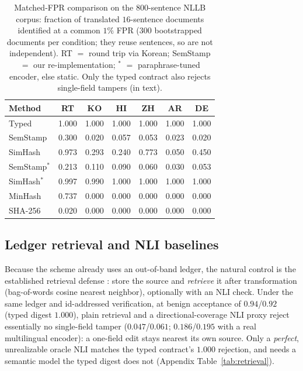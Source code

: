 \documentclass[journal]{IEEEtran}
\begin{document}
\begin{table}[t]
\centering
\caption{Matched-FPR comparison on the 800-sentence NLLB corpus: fraction of
translated $16$-sentence documents identified at a common $1\%$ FPR ($300$
bootstrapped documents per condition; they reuse sentences, so are not
independent). RT $=$ round trip via Korean; SemStamp $=$ our re-implementation;
$^\ast$ $=$ paraphrase-tuned encoder, else static. Only the typed contract also
rejects single-field tampers (in text).}
\label{tab:matched}
\footnotesize
\setlength{\tabcolsep}{3pt}
\begin{tabular*}{\linewidth}{@{}l@{\extracolsep{\fill}}cccccc@{}}
\toprule
Method & RT & KO & HI & ZH & AR & DE \\
\midrule
Typed          & 1.000 & 1.000 & 1.000 & 1.000 & 1.000 & 1.000 \\
SemStamp       & 0.300 & 0.020 & 0.057 & 0.053 & 0.023 & 0.020 \\
SimHash        & 0.973 & 0.293 & 0.240 & 0.773 & 0.050 & 0.450 \\
SemStamp$^\ast$ & 0.213 & 0.110 & 0.090 & 0.060 & 0.030 & 0.053 \\
SimHash$^\ast$  & 0.997 & 0.990 & 1.000 & 1.000 & 1.000 & 1.000 \\
MinHash        & 0.737 & 0.000 & 0.000 & 0.000 & 0.000 & 0.000 \\
SHA-256        & 0.020 & 0.000 & 0.000 & 0.000 & 0.000 & 0.000 \\
\bottomrule
\end{tabular*}
\end{table}

\subsection{Ledger retrieval and NLI baselines}
\label{sec:retrieval}
Because the scheme already uses an out-of-band ledger, the natural control is the established retrieval defense \cite{krishna2023retrieval}: store the source and \emph{retrieve} it after transformation (bag-of-words cosine nearest neighbor), optionally with an NLI check. Under the same ledger and id-addressed verification, at benign acceptance of $0.94$/$0.92$ (typed digest $1.000$), plain retrieval and a directional-coverage NLI proxy reject essentially no single-field tamper ($0.047$/$0.061$; $0.186$/$0.195$ with a real multilingual encoder): a one-field edit stays nearest its own source. Only a \emph{perfect}, unrealizable oracle NLI matches the typed contract's $1.000$ rejection, and needs a semantic model the typed digest does not (Appendix Table~\ref{tab:retrieval}).
\end{document}
